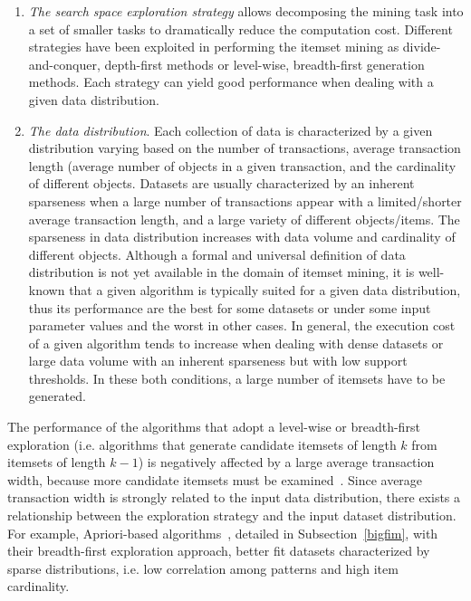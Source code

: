 \begin{enumerate}

\item \textit{The search space exploration strategy} allows decomposing the mining task into a set of smaller tasks to dramatically reduce the computation cost. Different strategies have been exploited in performing the itemset mining as divide-and-conquer, depth-first methods or level-wise, breadth-first generation methods.  Each strategy can yield good performance when dealing with a given data distribution. 

\item \textit{The data distribution}. Each collection of data is characterized by a given distribution varying based on the number of transactions, average transaction length (average number of objects in a given transaction, and the cardinality of different objects. Datasets are
usually characterized by an inherent sparseness when a large number of transactions appear with a limited/shorter average transaction length, and a large variety of different objects/items. The sparseness in data distribution
increases with data volume and cardinality of different objects.
Although a formal and universal definition of data distribution is not yet available in the domain of itemset mining, it is well-known that a given algorithm is typically suited for a given data distribution, thus its performance are the best for some datasets or under some input parameter values and the worst in other cases. In general, the execution cost of a given algorithm tends to increase when dealing with dense datasets or large data volume with an inherent sparseness but with low support thresholds. In these both conditions, a large number of itemsets have to be generated. \end{enumerate}

The performance of the algorithms that adopt a level-wise or breadth-first exploration  (i.e. algorithms that generate candidate itemsets of length $k$ from itemsets of length $k-1$) is negatively affected by a large average transaction width, because more candidate itemsets must be examined~\cite{KumarBook}. Since average transaction width is strongly related to the input data distribution, there exists a relationship between the exploration strategy and the input dataset distribution. For example, Apriori-based algorithms~\cite{Agr94}, detailed in Subsection~\ref{bigfim}, with their breadth-first exploration approach, better fit datasets characterized by
sparse distributions, i.e. low correlation among patterns and high item cardinality.



